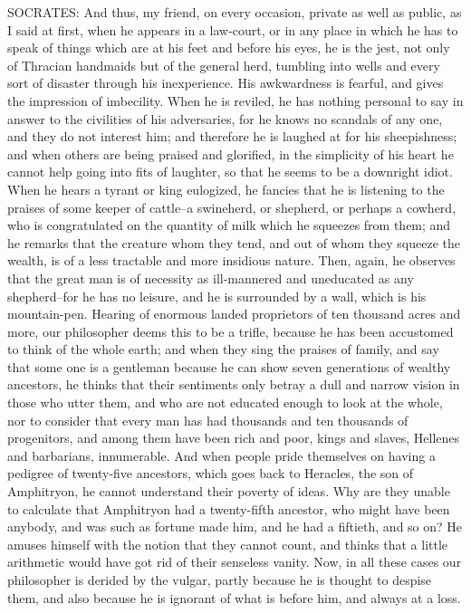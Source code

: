 SOCRATES: And thus, my friend, on every occasion, private as well as
public, as I said at first, when he appears in a law-court, or in any
place in which he has to speak of things which are at his feet and
before his eyes, he is the jest, not only of Thracian handmaids but of
the general herd, tumbling into wells and every sort of disaster through
his inexperience. His awkwardness is fearful, and gives the impression
of imbecility. When he is reviled, he has nothing personal to say in
answer to the civilities of his adversaries, for he knows no scandals
of any one, and they do not interest him; and therefore he is laughed at
for his sheepishness; and when others are being praised and glorified,
in the simplicity of his heart he cannot help going into fits of
laughter, so that he seems to be a downright idiot. When he hears a
tyrant or king eulogized, he fancies that he is listening to the
praises of some keeper of cattle--a swineherd, or shepherd, or perhaps a
cowherd, who is congratulated on the quantity of milk which he squeezes
from them; and he remarks that the creature whom they tend, and out of
whom they squeeze the wealth, is of a less tractable and more insidious
nature. Then, again, he observes that the great man is of necessity as
ill-mannered and uneducated as any shepherd--for he has no leisure,
and he is surrounded by a wall, which is his mountain-pen. Hearing
of enormous landed proprietors of ten thousand acres and more, our
philosopher deems this to be a trifle, because he has been accustomed to
think of the whole earth; and when they sing the praises of family, and
say that some one is a gentleman because he can show seven generations
of wealthy ancestors, he thinks that their sentiments only betray a
dull and narrow vision in those who utter them, and who are not educated
enough to look at the whole, nor to consider that every man has had
thousands and ten thousands of progenitors, and among them have been
rich and poor, kings and slaves, Hellenes and barbarians, innumerable.
And when people pride themselves on having a pedigree of twenty-five
ancestors, which goes back to Heracles, the son of Amphitryon, he cannot
understand their poverty of ideas. Why are they unable to calculate that
Amphitryon had a twenty-fifth ancestor, who might have been anybody,
and was such as fortune made him, and he had a fiftieth, and so on? He
amuses himself with the notion that they cannot count, and thinks that a
little arithmetic would have got rid of their senseless vanity. Now, in
all these cases our philosopher is derided by the vulgar, partly because
he is thought to despise them, and also because he is ignorant of what
is before him, and always at a loss.

